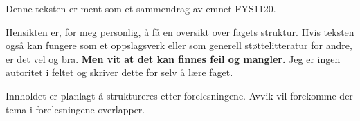 Denne teksten er ment som et sammendrag av emnet FYS1120.

Hensikten er, for meg personlig, å få en oversikt over fagets struktur.
Hvis teksten også kan fungere som et oppslagsverk eller som generell
støttelitteratur for andre, er det vel og bra.
\textbf{Men vit at det kan finnes feil og mangler.}
Jeg er ingen autoritet i feltet og skriver dette for selv å lære faget.

Innholdet er planlagt å struktureres etter forelesningene.
Avvik vil forekomme der tema i forelesningene overlapper.
